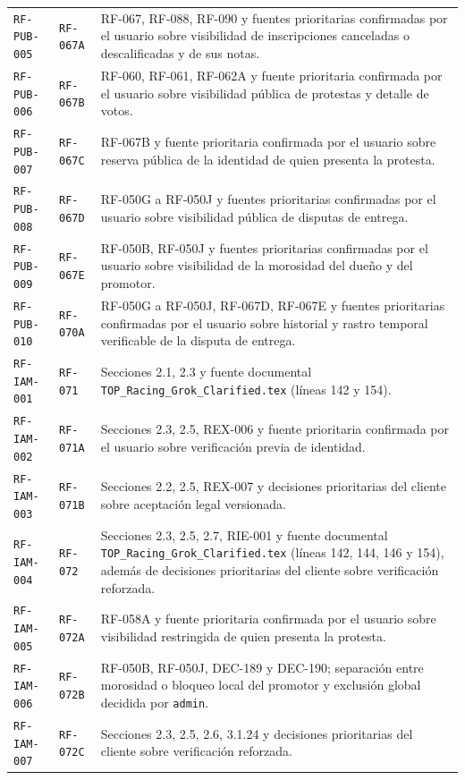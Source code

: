 \documentclass[10pt,letterpaper]{article}
\begin{document}
\begin{landscape}
\begin{longtable}{P{2.7cm}P{2.6cm}P{15.7cm}}
\texttt{RF-PUB-005} & \texttt{RF-067A} & RF-067, RF-088, RF-090 y fuentes prioritarias confirmadas por el usuario sobre visibilidad de inscripciones canceladas o descalificadas y de sus notas.\\
\texttt{RF-PUB-006} & \texttt{RF-067B} & RF-060, RF-061, RF-062A y fuente prioritaria confirmada por el usuario sobre visibilidad pública de protestas y detalle de votos.\\
\texttt{RF-PUB-007} & \texttt{RF-067C} & RF-067B y fuente prioritaria confirmada por el usuario sobre reserva pública de la identidad de quien presenta la protesta.\\
\texttt{RF-PUB-008} & \texttt{RF-067D} & RF-050G a RF-050J y fuentes prioritarias confirmadas por el usuario sobre visibilidad pública de disputas de entrega.\\
\texttt{RF-PUB-009} & \texttt{RF-067E} & RF-050B, RF-050J y fuentes prioritarias confirmadas por el usuario sobre visibilidad de la morosidad del dueño y del promotor.\\
\texttt{RF-PUB-010} & \texttt{RF-070A} & RF-050G a RF-050J, RF-067D, RF-067E y fuentes prioritarias confirmadas por el usuario sobre historial y rastro temporal verificable de la disputa de entrega.\\
\texttt{RF-IAM-001} & \texttt{RF-071} & Secciones 2.1, 2.3 y fuente documental \texttt{TOP\_Racing\_Grok\_Clarified.tex} (líneas 142 y 154).\\
\texttt{RF-IAM-002} & \texttt{RF-071A} & Secciones 2.3, 2.5, REX-006 y fuente prioritaria confirmada por el usuario sobre verificación previa de identidad.\\
\texttt{RF-IAM-003} & \texttt{RF-071B} & Secciones 2.2, 2.5, REX-007 y decisiones prioritarias del cliente sobre aceptación legal versionada.\\
\texttt{RF-IAM-004} & \texttt{RF-072} & Secciones 2.3, 2.5, 2.7, RIE-001 y fuente documental \texttt{TOP\_Racing\_Grok\_Clarified.tex} (líneas 142, 144, 146 y 154), además de decisiones prioritarias del cliente sobre verificación reforzada.\\
\texttt{RF-IAM-005} & \texttt{RF-072A} & RF-058A y fuente prioritaria confirmada por el usuario sobre visibilidad restringida de quien presenta la protesta.\\
\texttt{RF-IAM-006} & \texttt{RF-072B} & RF-050B, RF-050J, DEC-189 y DEC-190; separación entre morosidad o bloqueo local del promotor y exclusión global decidida por \texttt{admin}.\\
\texttt{RF-IAM-007} & \texttt{RF-072C} & Secciones 2.3, 2.5, 2.6, 3.1.24 y decisiones prioritarias del cliente sobre verificación reforzada.\\

\end{longtable}
\end{landscape}
\end{document}
